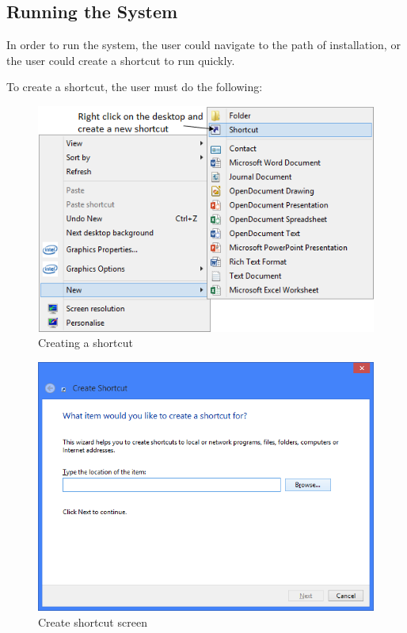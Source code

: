 \subsection{Running the System}

In order to run the system, the user could navigate to the path of installation, or the user could create a shortcut to run quickly.

To create a shortcut, the user must do the following:

\begin{figure}[H]
    \includegraphics[width=\textwidth]{./Manual/Installation/Shortcut.png}
    \caption{Creating a shortcut}
\end{figure}

\begin{figure}[H]
    \includegraphics[width=\textwidth]{./Manual/Installation/CreateShortcut.png}
    \caption{Create shortcut screen}
\end{figure}


